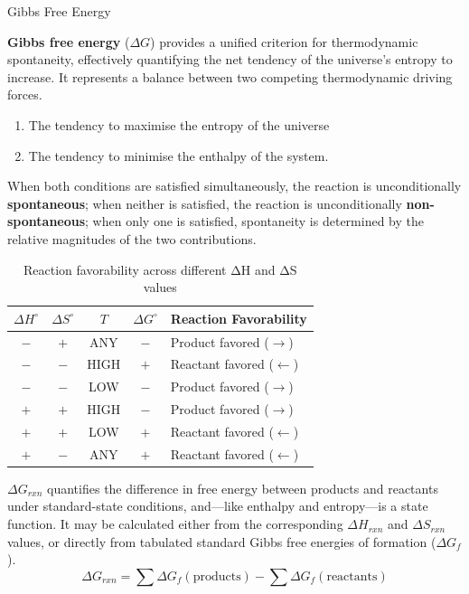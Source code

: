 \documentclass[10pt]{article}
\begin{document}
    \begin{core}[label=core:gibbs]{Gibbs Free Energy}

      \textbf{Gibbs free energy} ($\Delta G$) provides a unified criterion for thermodynamic spontaneity, effectively quantifying the net tendency of the universe's entropy to increase. It represents a balance between two competing thermodynamic driving forces.

      \begin{enumerate}[label=(\arabic*)]

        \item The tendency to maximise the entropy of the universe

        \item The tendency to minimise the enthalpy of the system.

      \end{enumerate}

      When both conditions are satisfied simultaneously, the reaction is unconditionally \textbf{spontaneous}; when neither is satisfied, the reaction is unconditionally \textbf{non-spontaneous}; when only one is satisfied, spontaneity is determined by the relative magnitudes of the two contributions.

      \begin{table}[H]
        \centering
        \begin{tabular}{c|c|c|c|l}
          $\Delta H^{\circ}$ & $\Delta S^{\circ}$ & $T$ & $\Delta G^{\circ}$ & Reaction Favorability \\ \hline
          $-$ & $+$ & ANY & $-$ & Product favored ($\rightarrow$) \\ \hline
          $-$ & $-$ & HIGH & $+$ & Reactant favored ($\leftarrow$) \\ \hline
          $-$ & $-$ & LOW & $-$ & Product favored ($\rightarrow$) \\ \hline
          $+$ & $+$ & HIGH & $-$ & Product favored ($\rightarrow$) \\ \hline
          $+$ & $+$ & LOW & $+$ & Reactant favored ($\leftarrow$) \\ \hline
          $+$ & $-$ & ANY & $+$ & Reactant favored ($\leftarrow$) \\
        \end{tabular}
        \label{tab:gibbs}
        \caption{Reaction favorability across different ΔH and ΔS values}
      \end{table}

      $\Delta G_{rxn}$ quantifies the difference in free energy between products and reactants under standard-state conditions, and---like enthalpy and entropy---is a state function. It may be calculated either from the corresponding $\Delta H_{rxn}$ and $\Delta S_{rxn}$ values, or directly from tabulated standard Gibbs free energies of formation ($\Delta G_{f}$).
      \[
        \Delta G_{rxn} = \sum \Delta G_{f}(\text{products}) - \sum \Delta G_{f}(\text{reactants})
      \]


\end{core}
\end{document}
